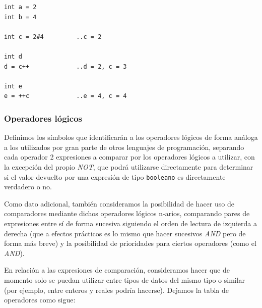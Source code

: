 \documentclass[11pt, english]{article}
\begin{document}
\begin{lstlisting}[caption=Ejemplo de uso los operadores artiméticos]
int a = 2
int b = 4

int c = 2#4			..c = 2

int d
d = c++				..d = 2, c = 3

int e
e = ++c				..e = 4, c = 4
\end{lstlisting}

\subsubsection{Operadores lógicos}
Definimos los símbolos que identificarán a los operadores lógicos de forma análoga a los utilizados por gran parte de otros lenguajes de programación, separando cada operador 2 expresiones a comparar por los operadores lógicos a utilizar, con la excepción del propio \emph{NOT}, que podrá utilizarse directamente para determinar si el valor devuelto por una expresión de tipo \texttt{booleano} es directamente verdadero o no. 


Como dato adicional, también consideramos la posibilidad de hacer uso de comparadores mediante dichos operadores lógicos n-arios, comparando pares de expresiones entre sí de forma sucesiva siguiendo el orden de lectura de izquierda a derecha (que a efectos prácticos es lo mismo que hacer sucesivos \emph{AND} pero de forma más breve) y la posibilidad de prioridades para ciertos operadores (como el \emph{AND}). \vspace{0px}

En relación a las expresiones de comparación, consideramos hacer que de momento solo se puedan utilizar entre tipos de datos del mismo tipo o similar (por ejemplo, entre enteros y reales podría hacerse). Dejamos la tabla de operadores como sigue: \vspace{0px}
\end{document}
